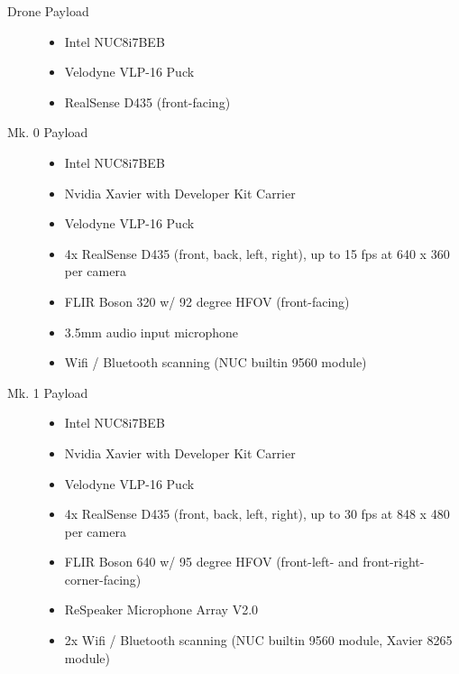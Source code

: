\begin{description}
	\item[Drone Payload] \hfill
	\begin{itemize}
		\item Intel NUC8i7BEB
		\item Velodyne VLP-16 Puck
		\item RealSense D435 (front-facing)
	\end{itemize}

	\item[Mk. 0 Payload] \hfill
	\begin{itemize}
		\item Intel NUC8i7BEB
		\item Nvidia Xavier with Developer Kit Carrier
		\item Velodyne VLP-16 Puck
		\item 4x RealSense D435 (front, back, left, right), up to 15 fps at 640 x 360 per camera
		\item FLIR Boson 320 w/ 92 degree HFOV (front-facing)
		\item 3.5mm audio input microphone
		\item Wifi / Bluetooth scanning (NUC builtin 9560 module)
	\end{itemize}	

	\item[Mk. 1 Payload] \hfill
	\begin{itemize}
		\item Intel NUC8i7BEB
		\item Nvidia Xavier with Developer Kit Carrier
		\item Velodyne VLP-16 Puck
		\item 4x RealSense D435 (front, back, left, right), up to 30 fps at 848 x 480 per camera
		\item FLIR Boson 640 w/ 95 degree HFOV (front-left- and front-right-corner-facing)
		\item ReSpeaker Microphone Array V2.0
		\item 2x Wifi / Bluetooth scanning (NUC builtin 9560 module, Xavier 8265 module)
	\end{itemize}
\end{description}

